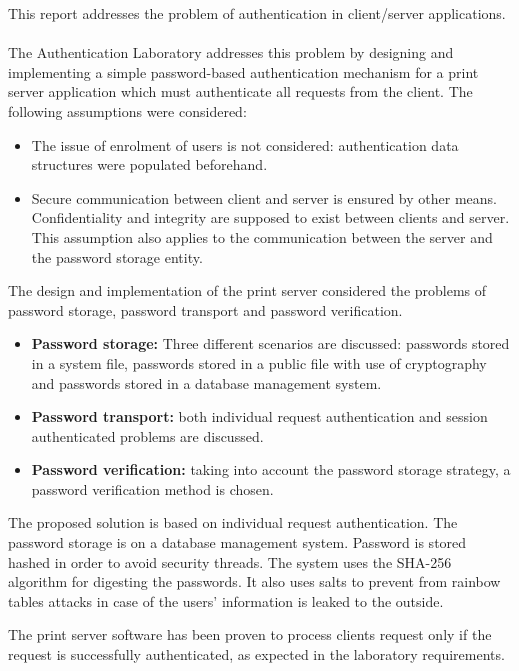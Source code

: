 This report addresses the problem of authentication in client/server applications.\\ \\
The Authentication Laboratory addresses this problem by designing and implementing a simple password-based authentication mechanism for a print server application which must authenticate all requests from the client.
The following assumptions were considered:
\begin{itemize}
	\item The issue of enrolment of users is not considered: authentication data structures were populated beforehand.
	\item Secure communication between client and server is ensured by other means. Confidentiality and integrity are supposed to exist between clients and server. This assumption also applies to the communication between the server and the password storage entity.
\end{itemize}
The design and implementation of the print server considered the problems of password storage, password transport and password verification.
\begin{itemize}
	\item \textbf{Password storage:} Three different scenarios are discussed: passwords stored in a system file, passwords stored in a public file with use of cryptography and passwords stored in a database management system.
	\item \textbf{Password transport:} both individual request authentication and session authenticated problems are discussed.
	\item \textbf{Password verification:} taking into account the password storage strategy, a password verification method is chosen.
\end{itemize}
The proposed solution is based on individual request authentication. The password storage is on a database management system. Password is stored hashed in order to avoid security threads. The system uses the SHA-256 algorithm for digesting the passwords. It also uses salts to prevent from rainbow tables attacks in case of the users' information is leaked to the outside.

The print server software has been proven to process clients request only if the request is successfully authenticated, as expected in the laboratory requirements.